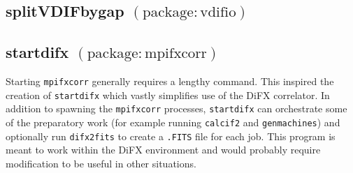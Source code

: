
\subsection{splitVDIFbygap {\small $\mathrm{(package: vdifio)}$}} \label{sec:splitVDIFbygap}




\subsection{startdifx {\small $\mathrm{(package: mpifxcorr)}$}} \label{sec:startdifx} 

Starting {\tt mpifxcorr} generally requires a lengthy command.
This inspired the creation of {\tt startdifx} which vastly simplifies use of the DiFX correlator.
In addition to spawning the {\tt mpifxcorr} processes, {\tt startdifx} can orchestrate some of the preparatory work (for example running {\tt calcif2} and {\tt genmachines}) and optionally run {\tt difx2fits} to create a {\tt .FITS} file for each job.
This program is meant to work within the DiFX environment and would probably require modification to be useful in other situations.

